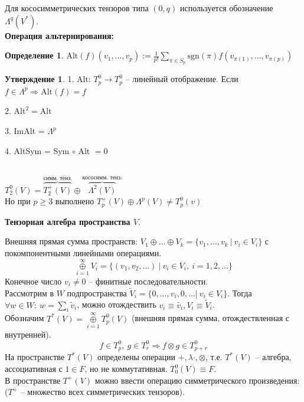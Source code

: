 \documentclass[a4paper, 12pt]{article}
\newcommand\tab[1][.5cm]{\hspace*{#1}}
\theoremstyle{definition}
\newtheorem*{definition}{Определение}
\newtheorem*{subtheorem}{Утверждение}
\begin{document}
    Для кососимметрических тензоров типа $(0,q)$ используется обозначение $\Lambda^q(V^*)$.\\
    \textbf{Операция альтернирования:}
    \begin{definition}
        $\text{Alt}(f)(v_1,...,v_p) := \frac{1}{p!}\sum\limits_{\pi \in S_p} \text{sgn}(\pi)f(v_{\pi(1)},..., v_{\pi(p)})$ 
    \end{definition}
    \begin{subtheorem}\tab[1cm]

        1. Alt: $T_p^0 \to T_p^0$ -- линейный отображение. Если $f \in \Lambda^p \Longrightarrow \text{Alt}(f) = f$
        
        2. $\text{Alt}^2 = \text{Alt}$
        
        3. ImAlt = $\Lambda^p$
        
        4. AltSym = Sym $\circ$ Alt $= 0$  
    \end{subtheorem} \tab[1cm]\\
    $T_2^0(V) = \overbrace{T_2^+(V)}^{\text{симм. тенз.}} \oplus \overbrace{\Lambda^2(V)}^{\text{кососимм. тенз.}}$\\
    Но при $p \geq 3$ выполнено $T_p^+(V) \oplus \Lambda^p(V) \neq T_p^0(v)$  
    \begin{center}
        \textbf{Тензорная алгебра пространства $V$}. 
    \end{center}
    Внешняя прямая сумма пространств: $V_1 \oplus ... \oplus V_k = \{v_1,...,v_k\ |\ v_i \in V_i\}$ с покомпонентными линейными операциями.
    $$\overset{\infty}{\underset{i=1}{\oplus}} V_i = \{(v_1,v_2,...)\ |\ v_i \in V_i,\ i = 1,2,...\}$$
    Конечное число $v_i \neq 0$ -- финитные последовательности.\\
    Рассмотрим в $W$ подпространства $\widetilde{V}_i = \{0,...,v_i,0,...|\ v_i \in V_i\}$. Тогда $\forall w \in W:\ w = \sum\limits_{i} \widetilde{v}_i$, можно отождествить $v_i \equiv \widetilde{v_i}, V_i \equiv \widetilde{V}_i$.\\
    Обозначим $T^*(V) = \overset{\infty}{\underset{i=1}{\oplus}}T_p^0(V)$ (внешняя прямая сумма, отождествленная с внутренней). 
    $$f \in T_p^0,\ g \in T_r^0 \Longrightarrow f \otimes g \in T_{p+r}^0$$
    На пространстве $T^*(V)$ определены операции $+,\lambda\cdot,\otimes$, т.е. $T^*(V)$ -- алгебра, ассоциативная с $1 \in F$, но не коммутативная. $T_0^0(V) \equiv F$.\\
    В пространстве $T^+(V)$ можно ввести операцию симметрического произведения: ($T^+$ -- множество всех симметрических тензоров).\\
\end{document}
